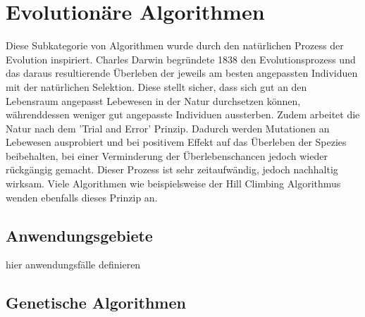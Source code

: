 \chapter{Evolutionäre Algorithmen}

Diese Subkategorie von Algorithmen wurde durch den natürlichen Prozess der Evolution
inspiriert. Charles Darwin begründete 1838 den Evolutionsprozess und das daraus resultierende
Überleben der jeweils am besten angepassten Individuen mit der natürlichen Selektion.
Diese stellt sicher, dass sich gut an den Lebensraum angepasst Lebewesen in der Natur
durchsetzen können, währenddessen weniger gut angepasste Individuen aussterben. Zudem
arbeitet die Natur nach dem 'Trial and Error' Prinzip. Dadurch werden Mutationen an
Lebewesen ausprobiert und bei positivem Effekt auf das Überleben der Spezies beibehalten,
bei einer Verminderung der Überlebenschancen jedoch wieder rückgängig gemacht. Dieser Prozess
ist sehr zeitaufwändig, jedoch nachhaltig wirksam. Viele Algorithmen wie beispielsweise
der Hill Climbing Algorithmus wenden ebenfalls dieses Prinzip an.

\section{Anwendungsgebiete}
hier anwendungsfälle definieren

\section{Genetische Algorithmen}


